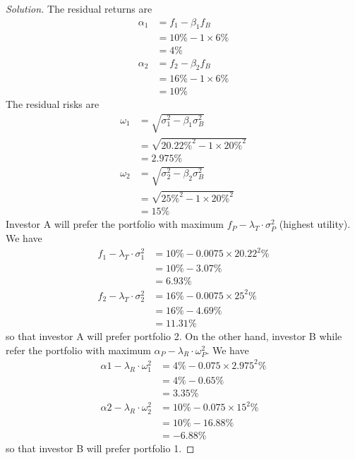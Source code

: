 \begin{proof}[Solution]
 The residual returns are
 \begin{align*}
  \alpha_{1} &= f_{1} - \beta_{1}f_{B} \\
	     &= 10\%-1\times 6\%\\
	     &= 4\% \\
  \alpha_{2} &= f_{2} - \beta_{2}f_{B} \\
	     &= 16\%-1\times 6\%\\
	     &= 10\% 
 \end{align*}
 The residual risks are
 \begin{align*}
  \omega_{1} &= \sqrt{\sigma_{1}^{2} - \beta_{1}\sigma_{B}^{2}} \\
	     &= \sqrt{20.22 \% ^{2} - 1\times 20 \% ^2} \\
	     &= 2.975 \%\\
  \omega_{2} &= \sqrt{\sigma_{2}^{2} - \beta_{2}\sigma_{B}^{2}} \\
	     &= \sqrt{25 \% ^{2} - 1\times 20 \% ^2} \\
	     &= 15 \%
 \end{align*}
 Investor A will prefer the portfolio with maximum $f_{P}-\lambda_{T}\cdot\sigma_{P}^{2}$ (highest utility). We have
 \begin{align*}
  f_{1}-\lambda_{T}\cdot\sigma_{1}^{2} &= 10\% - 0.0075 \times 20.22^{2} \% \\
				       &= 10\% - 3.07\% \\
				       &= 6.93\%\\
  f_{2}-\lambda_{T}\cdot\sigma_{2}^{2} &= 16\% - 0.0075 \times 25^{2} \% \\
				       &= 16\% - 4.69\% \\
				       &= 11.31\%       
 \end{align*}
 so that investor A will prefer portfolio 2. On the other hand, investor B while refer the portfolio with maximum $\alpha_{P}-\lambda_{R}\cdot\omega_{P}^{2}$. We have
 \begin{align*}
  \alpha{1}-\lambda_{R}\cdot\omega_{1}^{2} &= 4\% - 0.075 \times 2.975^{2} \% \\
				       &= 4\% - 0.65\% \\
				       &= 3.35\%\\
  \alpha{2}-\lambda_{R}\cdot\omega_{2}^{2} &= 10\% - 0.075 \times 15^{2} \% \\
				       &= 10\% - 16.88\% \\
				       &= -6.88\%
 \end{align*}
 so that investor B will prefer portfolio 1.

\end{proof}

